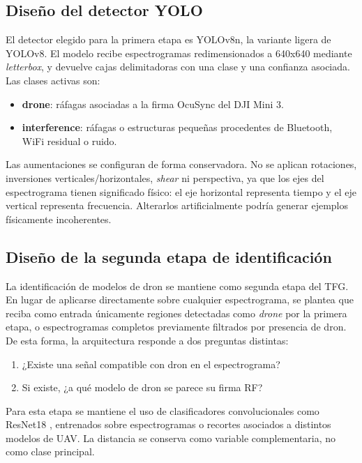 \subsection{Diseño del detector YOLO}
\label{subsec:diseno_yolo}

El detector elegido para la primera etapa es YOLOv8n, la variante ligera de YOLOv8. El modelo recibe espectrogramas redimensionados a \num{640}x\num{640} mediante \emph{letterbox}, y devuelve cajas delimitadoras con una clase y una confianza asociada. Las clases activas son:

\begin{itemize}
  \item \textbf{drone}: ráfagas asociadas a la firma OcuSync del DJI Mini 3.
  \item \textbf{interference}: ráfagas o estructuras pequeñas procedentes de Bluetooth, WiFi residual o ruido.
\end{itemize}

Las aumentaciones se configuran de forma conservadora. No se aplican rotaciones, inversiones verticales/horizontales, \emph{shear} ni perspectiva, ya que los ejes del espectrograma tienen significado físico: el eje horizontal representa tiempo y el eje vertical representa frecuencia. Alterarlos artificialmente podría generar ejemplos físicamente incoherentes.

\subsection{Diseño de la segunda etapa de identificación}
\label{subsec:diseno_identificacion}

La identificación de modelos de dron se mantiene como segunda etapa del TFG. En lugar de aplicarse directamente sobre cualquier espectrograma, se plantea que reciba como entrada únicamente regiones detectadas como \emph{drone} por la primera etapa, o espectrogramas completos previamente filtrados por presencia de dron. De esta forma, la arquitectura responde a dos preguntas distintas:

\begin{enumerate}
  \item ¿Existe una señal compatible con dron en el espectrograma?
  \item Si existe, ¿a qué modelo de dron se parece su firma RF?
\end{enumerate}

Para esta etapa se mantiene el uso de clasificadores convolucionales como ResNet18 \cite{he2016resnet}, entrenados sobre espectrogramas o recortes asociados a distintos modelos de UAV. La distancia se conserva como variable complementaria, no como clase principal.

